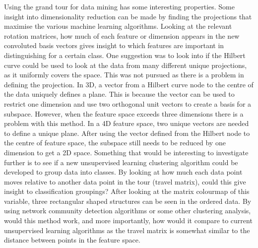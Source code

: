 \documentclass[a4paper,11pt,twoside]{article}
\begin{document}
Using the grand tour for data mining has some interesting properties. Some insight into dimensionality reduction can be made by finding the projections that maximise the various machine learning algorithms. Looking at the relevant rotation matrices, how much of each feature or dimension appears in the new convoluted basis vectors gives insight to which features are important in distinguishing for a certain class.
\newline
\newline
One suggestion was to look into if the Hilbert curve could be used to look at the data from many different unique projections, as it uniformly covers the space. This was not pursued as there is a problem in defining the projection. In 3D, a vector from a Hilbert curve node to the centre of the data uniquely defines a plane. This is because the vector can be used to restrict one dimension and use two orthogonal unit vectors to create a basis for a subspace. However, when the feature space exceeds three dimensions there is a problem with this method. In a 4D feature space, two unique vectors are needed to define a unique plane. After using the vector defined from the Hilbert node to the centre of feature space, the subspace still needs to be reduced by one dimension to get a 2D space.
\newline
\newline
Something that would be interesting to investigate further is to see if a new unsupervised learning clustering algorithm could be developed to group data into classes. By looking at how much each data point moves relative to another data point in the tour (travel matrix), could this give insight to classification groupings? After looking at the matrix colourmap of this variable, three rectangular shaped structures can be seen in the ordered data. By using network community detection algorithms or some other clustering analysis, would this method work, and more importantly, how would it compare to current unsupervised learning algorithms as the travel matrix is somewhat similar to the distance between points in the feature space.

\newpage


\end{document}
